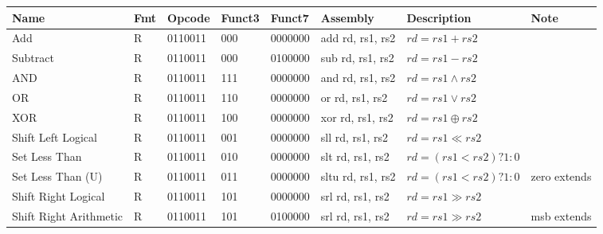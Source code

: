     \begin{tabular}{|l|l|l|l|l|l|l|p{2.2cm}|}
    	\hline
        Name & Fmt & Opcode & Funct3 & Funct7 & Assembly &Description & Note \\
        \hline
        Add                                & R & 0110011 & 000 & 0000000 & add rd, rs1, rs2   &$rd = rs1 + rs2$             &                                            \\
        Subtract                         & R & 0110011 & 000 & 0100000 & sub rd, rs1, rs2   & $rd = rs1 - rs2 $            &                                            \\
        AND                                & R & 0110011 & 111  & 0000000 & and rd, rs1, rs2   & $rd = rs1 \land rs2$      &                                             \\
        OR                                  & R & 0110011 & 110  & 0000000 & or rd, rs1, rs2     & $rd = rs1 \lor rs2$         &                                             \\
        XOR                                & R & 0110011 & 100  & 0000000 & xor rd, rs1, rs2   & $rd = rs1 \oplus rs2$    &                                              \\
        Shift Left Logical             & R & 0110011 & 001  & 0000000 & sll rd, rs1, rs2    & $rd = rs1 \ll rs2$            &                                              \\
        Set Less Than                 & R & 0110011 & 010  & 0000000 & slt rd, rs1, rs2    & $rd = (rs1 < rs2)?1:0$   &                                              \\
        Set Less Than (U)           & R & 0110011 & 011  & 0000000 & sltu rd, rs1, rs2   & $rd = (rs1 < rs2)?1:0$   & zero extends \footnotemark  \\
        Shift Right Logical           & R & 0110011 & 101  & 0000000 & srl rd, rs1, rs2     & $rd = rs1 \gg rs2$        &                                               \\
        Shift Right Arithmetic      & R & 0110011 & 101  & 0100000 & srl rd, rs1, rs2     & $rd = rs1 \gg rs2$         & msb extends \footnotemark   \\
        \hline
    \end{tabular}
